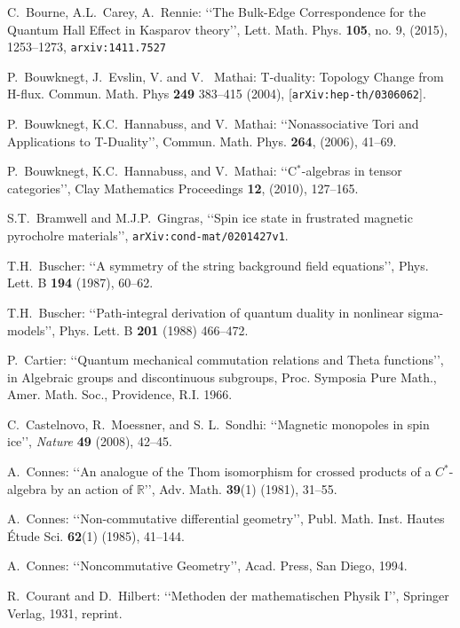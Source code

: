 \documentclass[11pt]{article}
\begin{document}
\begin{thebibliography}{99}
C.\ Bourne, A.L.\ Carey,  A.\  Rennie: \lq\lq The Bulk-Edge Correspondence for the Quantum Hall Effect in Kasparov theory\rq\rq, Lett. Math. Phys.  {\bf 105}, no. 9,  (2015), 1253--1273,  {\tt arxiv:1411.7527}
 
P.\ Bouwknegt, J.\  Evslin, V. and V. \ Mathai: T-duality: Topology Change from H-flux. Commun. Math. Phys {\bf 249} 383--415 (2004),
{[{\tt arXiv:hep-th/0306062}]}.

P.\  Bouwknegt, K.C.\  Hannabuss, and V.\  Mathai: \lq\lq Nonassociative Tori and Applications to T-Duality\rq\rq, Commun. Math. Phys. {\bf 264}, (2006), 41--69.

P.\  Bouwknegt, K.C.\  Hannabuss, and V.\  Mathai: \lq\lq C$^*$-algebras in tensor categories\rq\rq, Clay Mathematics Proceedings  {\bf 12}, (2010), 127--165.


S.T.\ Bramwell and M.J.P.\ Gingras, \lq\lq Spin ice state in frustrated magnetic pyrocholre materials\rq\rq, {\tt arXiv:cond-mat/0201427v1}.

T.H.\  Buscher: \lq\lq A symmetry of the string background field equations\rq\rq, Phys. Lett. B {\bf 194} (1987), 60--62.

T.H.\  Buscher: \lq\lq Path-integral derivation of quantum duality in nonlinear sigma-models\rq\rq, Phys. Lett. B {\bf 201} (1988) 466--472.

P.\ Cartier: \lq\lq Quantum mechanical  commutation relations and Theta functions\rq\rq, in Algebraic groups and discontinuous subgroups,  Proc. Symposia Pure Math., Amer. Math. Soc., Providence, R.I.  1966.

C.\ Castelnovo, R.\ Moessner, and S. L.\ Sondhi: \lq\lq Magnetic monopoles in spin ice\rq\rq,  {\it Nature} {\bf 49} (2008), 42--45.

A.\  Connes: \lq\lq An analogue of the Thom isomorphism for crossed products of a $C^*$-algebra by an action of $\mathbb{R}$\rq\rq, Adv. Math. {\bf 39}(1) (1981), 31--55.

A.\ Connes: \lq\lq Non-commutative differential geometry\rq\rq,  Publ. Math. Inst. Hautes \'{E}tude Sci. {\bf 62}(1) (1985), 41--144.

A.\ Connes: \lq\lq Noncommutative Geometry\rq\rq,  Acad. Press, San Diego, 1994.

R.\  Courant and D.\  Hilbert: \lq\lq Methoden der mathematischen Physik I\rq\rq, Springer Verlag, 1931, reprint.


\end{thebibliography}
\end{document}
